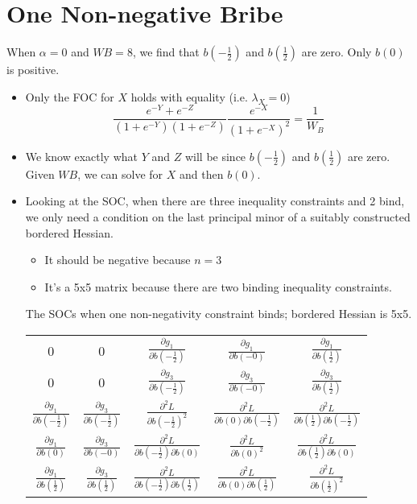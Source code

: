 \documentclass[12pt]{article}
\newcommand{\al}{\alpha}
\begin{document}
\section{One Non-negative Bribe}
When $\al = 0$ and $WB=8$, we find that $b\left(-\frac{1}{2}\right)$ and $b\left(\frac{1}{2}\right)$ are zero. Only $b(0)$ is positive.
\begin{itemize}
	\item Only the FOC for $X$ holds with equality (i.e. $\lambda_X = 0$)
		\[
			\frac{e^{-Y} + e^{-Z}}{\left(1+e^{-Y}\right)\left(1+e^{-Z}\right)} \frac{e^{-X}}{\left(1+e^{-X}\right)^2}= \frac{1}{W_B}
		\]
	\item We know exactly what $Y$ and $Z$ will be since $b\left(-\frac{1}{2}\right)$ and $b\left(\frac{1}{2}\right)$ are zero. Given $WB$, we can solve for $X$ and then $b(0)$.
	\item Looking at the SOC, when there are three inequality constraints and 2 bind, we only need a condition on the last principal minor of a suitably constructed bordered Hessian.
		\begin{itemize}
			\item It should be negative because $n=3$
			\item It's a 5x5 matrix because there are two binding inequality constraints.
		\end{itemize}
		The SOCs when one non-negativity constraint binds; bordered Hessian is 5x5. \\
		\begin{tabular}{ccccc}
			0 & 0 & $\frac{\partial g_1}{\partial b\left(-\frac{1}{2}\right)}$ & $\frac{\partial g_1}{\partial b\left(-0\right)}$ & $\frac{\partial g_1}{\partial b\left(\frac{1}{2}\right)}$ \\
			0 & 0 & $\frac{\partial g_3}{\partial b\left(-\frac{1}{2}\right)}$ & $\frac{\partial g_3}{\partial b\left(-0\right)}$ & $\frac{\partial g_3}{\partial b\left(\frac{1}{2}\right)}$ \\
			$\frac{\partial g_1}{\partial b\left(-\frac{1}{2}\right)}$ & $\frac{\partial g_3}{\partial b\left(-\frac{1}{2}\right)}$& $\frac{\partial^2 L}{\partial b\left(-\frac{1}{2}\right)^2}$ & $\frac{\partial^2 L}{\partial b(0)\partial b\left(-\frac{1}{2}\right)}$ & $\frac{\partial^2 L}{\partial b\left(\frac{1}{2}\right)\partial b\left(-\frac{1}{2}\right)}$  \\
			$\frac{\partial g_1}{\partial b\left(0\right)}$ & $\frac{\partial g_3}{\partial b\left(-0\right)}$ & $\frac{\partial^2 L}{\partial b\left(-\frac{1}{2}\right)\partial b\left(0\right)}$ & $\frac{\partial^2 L}{\partial b(0)^2}$ & $\frac{\partial^2 L}{\partial b\left(\frac{1}{2}\right)\partial b\left(0\right)}$ \\
			$\frac{\partial g_1}{\partial b\left(\frac{1}{2}\right)}$ & $\frac{\partial g_3}{\partial b\left(\frac{1}{2}\right)}$ & $\frac{\partial^2 L}{\partial b\left(-\frac{1}{2}\right)\partial b\left(\frac{1}{2}\right)}$ & $\frac{\partial^2 L}{\partial b(0) \partial b\left(\frac{1}{2}\right)}$ & $\frac{\partial^2 L}{\partial b\left(\frac{1}{2}\right)^2}$
		\end{tabular} \\


\end{itemize}
\end{document}
